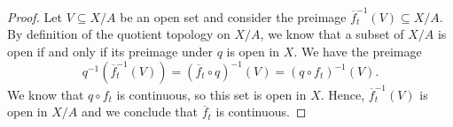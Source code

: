 \documentclass[12pt]{article}
\theoremstyle{definition}
\newcommand{\<}{\langle}
\renewcommand{\>}{\rangle}
\newcommand{\eqc}{\overline}
\begin{document}
\begin{proof}
    Let $V \subseteq X/A$ be an open set and consider the preimage $\eqc{f}_t^{-1}(V) \subseteq X/A$.
    By definition of the quotient topology on $X/A$, we know that a subset of $X/A$ is open if and only if its preimage under $q$ is open in $X$.
    We have the preimage
    \[
        q^{-1}(\eqc{f}_t^{-1}(V))
            = (\eqc{f}_t \circ q)^{-1}(V)
            = (q \circ f_t)^{-1}(V).
    \]
    We know that $q \circ f_t$ is continuous, so this set is open in $X$.
    Hence, $\eqc{f}_t^{-1}(V)$ is open in $X/A$ and we conclude that $\eqc{f}_t$ is continuous.
\end{proof}
\end{document}
